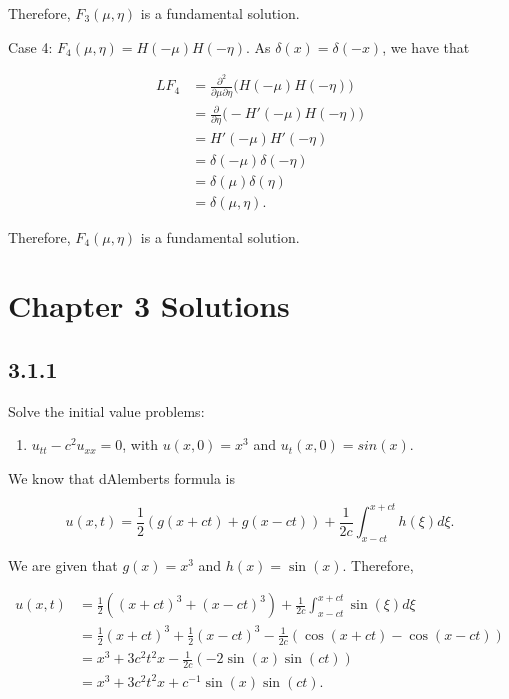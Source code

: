 \documentclass{article}
\begin{document}
Therefore, $F_3(\mu,\eta)$ is a fundamental solution.

Case 4: $F_4(\mu,\eta)=H(-\mu)H(-\eta)$. As $\delta(x)=\delta(-x)$, we have that

\begin{equation*}
\begin{split}
LF_4 &= \frac{\partial^2}{\partial\mu\partial\eta}\Big(H(-\mu)H(-\eta)\Big)\\&= 
\frac{\partial}{\partial\eta}\Big(-H'(-\mu)H(-\eta)\Big) \\&= 
H'(-\mu)H'(-\eta) \\&=
\delta(-\mu)\delta(-\eta) \\&=
\delta(\mu)\delta(\eta) \\&=
\delta(\mu,\eta).
\end{split}
\end{equation*}

Therefore, $F_4(\mu,\eta)$ is a fundamental solution.

\section{Chapter 3 Solutions}
\subsection{\textbf{3.1.1}} Solve the initial value problems:

\begin{enumerate}[label=(\alph*)]
    \item $u_{tt}-c^2 u_{xx}=0$, with $u(x,0)=x^3$ and $u_t(x,0)=sin(x)$.
\end{enumerate}

We know that d\textsc{}Alembert\textsc{}s formula is

$$u(x,t)=\frac{1}{2}(g(x+ct)+g(x-ct)) + \frac{1}{2c}\int_{x-ct}^{x+ct}h(\xi)d\xi.$$

We are given that $g(x)=x^3$ and $h(x)=\sin(x)$. Therefore,

\begin{align*}
u(x,t) &= \frac{1}{2}((x+ct)^3+(x-ct)^3)+\frac{1}{2c}\int_{x-ct}^{x+ct}\sin(\xi)d\xi \\
       &= \frac{1}{2}(x+ct)^3+\frac{1}{2}(x-ct)^3-\frac{1}{2c}(\cos(x+ct)-\cos(x-ct)) \\
       &= x^3+3c^2t^2x - \frac{1}{2c}(-2\sin(x)\sin(ct)) \\
       &= x^3 + 3c^2t^2x + c^{-1}\sin(x)\sin(ct).
\end{align*}
\end{document}

